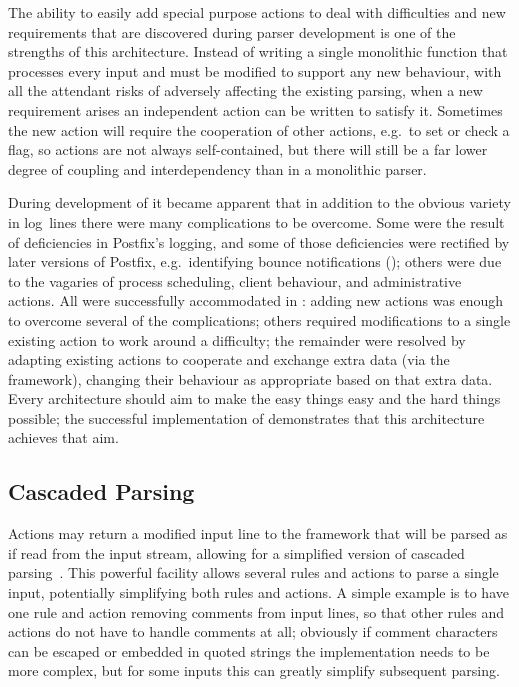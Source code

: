 The ability to easily add special purpose actions to deal with difficulties
and new requirements that are discovered during parser development is one
of the strengths of this architecture.  Instead of writing a single
monolithic function that processes every input and must be modified to
support any new behaviour, with all the attendant risks of adversely
affecting the existing parsing, when a new requirement arises an
independent action can be written to satisfy it.  Sometimes the new action
will require the cooperation of other actions, e.g.\ to set or check a
flag, so actions are not always self-contained, but there will still be a
far lower degree of coupling and interdependency than in a monolithic
parser.

During development of \parsername{} it became apparent that in addition to
the obvious variety in log~lines there were many complications to be
overcome.  Some were the result of deficiencies in Postfix's logging, and
some of those deficiencies were rectified by later versions of Postfix,
e.g.\ identifying bounce notifications
(); others were due to the
vagaries of process scheduling, client behaviour, and administrative
actions.  All were successfully accommodated in \parsername{}: adding new
actions was enough to overcome several of the complications; others
required modifications to a single existing action to work around a
difficulty; the remainder were resolved by adapting existing actions to
cooperate and exchange extra data (via the framework), changing their
behaviour as appropriate based on that extra data.  Every architecture
should aim to make the easy things easy and the hard things possible; the
successful implementation of \parsername{} demonstrates that this
architecture achieves that aim.

\subsection{Cascaded Parsing}

\label{cascaded parsing}

Actions may return a modified input line to the framework that will be
parsed as if read from the input stream, allowing for a simplified version
of cascaded parsing~\cite{cascaded-parsing}.  This powerful facility allows
several rules and actions to parse a single input, potentially simplifying
both rules and actions.  A simple example is to have one rule and action
removing comments from input lines, so that other rules and actions do not
have to handle comments at all; obviously if comment characters can be
escaped or embedded in quoted strings the implementation needs to be more
complex, but for some inputs this can greatly simplify subsequent parsing.

